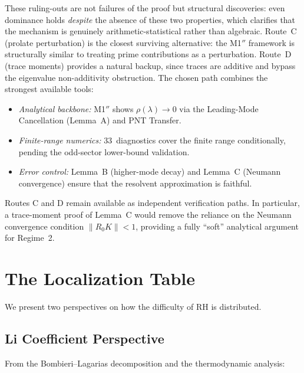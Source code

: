 \documentclass[12pt,a4paper]{article}
\theoremstyle{definition}
\theoremstyle{remark}
\begin{document}
These ruling-outs are not failures of the proof but structural discoveries: even dominance holds \emph{despite} the absence of these two properties, which clarifies that the mechanism is genuinely arithmetic-statistical rather than algebraic. Route~C (prolate perturbation) is the closest surviving alternative: the M1$''$ framework is structurally similar to treating prime contributions as a perturbation. Route~D (trace moments) provides a natural backup, since traces are additive and bypass the eigenvalue non-additivity obstruction. The chosen path combines the strongest available tools:

\begin{itemize}
  \item \emph{Analytical backbone:} M1$''$ shows $\rho(\lambda) \to 0$ via the Leading-Mode Cancellation (Lemma~A) and PNT Transfer.
  \item \emph{Finite-range numerics:} 33~diagnostics cover the finite range conditionally, pending the odd-sector lower-bound validation.
  \item \emph{Error control:} Lemma~B (higher-mode decay) and Lemma~C (Neumann convergence) ensure that the resolvent approximation is faithful.
\end{itemize}

\noindent Routes C and D remain available as independent verification paths. In particular, a trace-moment proof of Lemma~C would remove the reliance on the Neumann convergence condition $\|R_0 K\| < 1$, providing a fully ``soft'' analytical argument for Regime~2.


\section{The Localization Table}
\label{sec:localization}

We present two perspectives on how the difficulty of RH is distributed.

\subsection{Li Coefficient Perspective}

From the Bombieri--Lagarias decomposition and the thermodynamic analysis:
\end{document}
